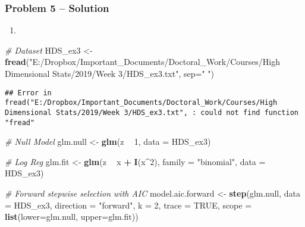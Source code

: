 \documentclass[]{article}
\newenvironment{Shaded}{\begin{snugshade}}{\end{snugshade}}
\newcommand{\CommentTok}[1]{\textcolor[rgb]{0.56,0.35,0.01}{\textit{#1}}}
\newcommand{\DataTypeTok}[1]{\textcolor[rgb]{0.13,0.29,0.53}{#1}}
\newcommand{\DecValTok}[1]{\textcolor[rgb]{0.00,0.00,0.81}{#1}}
\newcommand{\KeywordTok}[1]{\textcolor[rgb]{0.13,0.29,0.53}{\textbf{#1}}}
\newcommand{\NormalTok}[1]{#1}
\newcommand{\OperatorTok}[1]{\textcolor[rgb]{0.81,0.36,0.00}{\textbf{#1}}}
\newcommand{\OtherTok}[1]{\textcolor[rgb]{0.56,0.35,0.01}{#1}}
\newcommand{\StringTok}[1]{\textcolor[rgb]{0.31,0.60,0.02}{#1}}
\begin{document}
\hypertarget{problem-5-solution}{%
\subsubsection{Problem 5 -- Solution}\label{problem-5-solution}}

\begin{enumerate}
\def\labelenumi{(\alph{enumi})}
\item
\end{enumerate}

\begin{Shaded}
\begin{Highlighting}[]
\CommentTok{# Dataset}
\NormalTok{HDS_ex3 <-}\StringTok{ }\KeywordTok{fread}\NormalTok{(}\StringTok{"E:/Dropbox/Important_Documents/Doctoral_Work/Courses/High Dimensional Stats/2019/Week 3/HDS_ex3.txt"}\NormalTok{, }\DataTypeTok{sep=}\StringTok{" "}\NormalTok{)}
\end{Highlighting}
\end{Shaded}

\begin{verbatim}
## Error in fread("E:/Dropbox/Important_Documents/Doctoral_Work/Courses/High Dimensional Stats/2019/Week 3/HDS_ex3.txt", : could not find function "fread"
\end{verbatim}

\begin{Shaded}
\begin{Highlighting}[]
\CommentTok{# Null Model}
\NormalTok{glm.null <-}\StringTok{ }\KeywordTok{glm}\NormalTok{(z }\OperatorTok{~}\StringTok{ }\DecValTok{1}\NormalTok{, }\DataTypeTok{data =}\NormalTok{ HDS_ex3)}

\CommentTok{# Log Reg}
\NormalTok{glm.fit <-}\StringTok{ }\KeywordTok{glm}\NormalTok{(z }\OperatorTok{~}\StringTok{ }\NormalTok{x }\OperatorTok{+}\StringTok{ }\KeywordTok{I}\NormalTok{(x}\OperatorTok{^}\DecValTok{2}\NormalTok{), }\DataTypeTok{family =} \StringTok{"binomial"}\NormalTok{, }\DataTypeTok{data =}\NormalTok{ HDS_ex3)}

\CommentTok{# Forward stepwise selection with AIC}
\NormalTok{model.aic.forward <-}\StringTok{ }\KeywordTok{step}\NormalTok{(glm.null, }\DataTypeTok{data =}\NormalTok{ HDS_ex3, }\DataTypeTok{direction =} \StringTok{"forward"}\NormalTok{, }\DataTypeTok{k =} \DecValTok{2}\NormalTok{, }\DataTypeTok{trace =} \OtherTok{TRUE}\NormalTok{,}
                          \DataTypeTok{scope =} \KeywordTok{list}\NormalTok{(}\DataTypeTok{lower=}\NormalTok{glm.null, }\DataTypeTok{upper=}\NormalTok{glm.fit))}
\end{Highlighting}
\end{Shaded}
\end{document}

